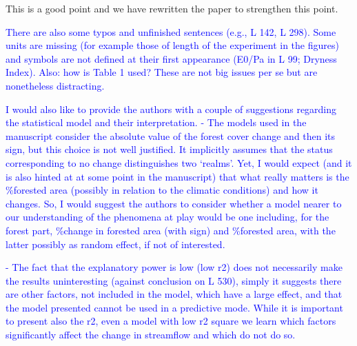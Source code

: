 \documentclass[]{elsarticle} %
\begin{document}
This is a good point and we have rewritten the paper to strengthen this point.

\textcolor{blue}{There are also some typos and unfinished sentences (e.g., L 142, L 298). Some units are missing (for example those of length of the experiment in the figures) and symbols are not defined at their first appearance (E0/Pa in L 99; Dryness Index). Also: how is Table 1 used? These are not big issues per se but are nonetheless distracting.}

\textcolor{blue}{I would also like to provide the authors with a couple of suggestions regarding the statistical model and their interpretation. 
- The models used in the manuscript consider the absolute value of the forest cover change and then its sign, but this choice is not well justified. It implicitly assumes that the status corresponding to no change distinguishes two ‘realms’. Yet, I would expect (and it is also hinted at at some point in the manuscript) that what really matters is the \%forested area (possibly in relation to the climatic conditions) and how it changes. So, I would suggest the authors to consider whether a model nearer to our understanding of the phenomena at play would be one including, for the forest part, \%change in forested area (with sign) and \%forested area, with the latter possibly as random effect, if not of interested.}

\textcolor{blue}{- The fact that the explanatory power is low (low r2) does not necessarily make the results uninteresting (against conclusion on L 530), simply it suggests there are other factors, not included in the model, which have a large effect, and that the model presented cannot be used in a predictive mode. While it is important to present also the r2, even a model with low r2 square we learn which factors significantly affect the change in streamflow and which do not do so.}
\end{document}

